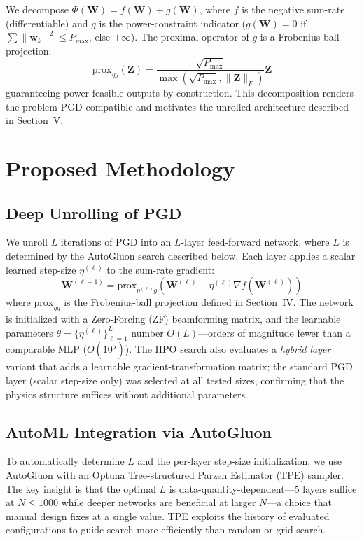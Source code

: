 \documentclass[conference,11pt]{IEEEtran}
\begin{document}
We decompose $\Phi(\mathbf{W}) = f(\mathbf{W}) + g(\mathbf{W})$, where $f$ is the negative sum-rate (differentiable) and $g$ is the power-constraint indicator ($g(\mathbf{W})=0$ if $\sum\|\mathbf{w}_k\|^2\leq P_{\max}$, else $+\infty$). The proximal operator of $g$ is a Frobenius-ball projection:
\begin{equation}
\text{prox}_{\eta g}(\mathbf{Z}) = \frac{\sqrt{P_{\max}}}{\max(\sqrt{P_{\max}}, \|\mathbf{Z}\|_F)} \mathbf{Z}
\end{equation}
guaranteeing power-feasible outputs by construction. This decomposition renders the problem PGD-compatible and motivates the unrolled architecture described in Section~V.

\section{Proposed Methodology}
\subsection{Deep Unrolling of PGD}
We unroll $L$ iterations of PGD into an $L$-layer feed-forward network, where $L$ is determined by the AutoGluon search described below. Each layer applies a scalar learned step-size $\eta^{(\ell)}$ to the sum-rate gradient:
\begin{equation}
\mathbf{W}^{(\ell+1)} = \text{prox}_{\eta^{(\ell)} g}\!\left(\mathbf{W}^{(\ell)} - \eta^{(\ell)} \nabla f(\mathbf{W}^{(\ell)})\right)
\end{equation}
where $\text{prox}_{\eta g}$ is the Frobenius-ball projection defined in Section~IV. The network is initialized with a Zero-Forcing (ZF) beamforming matrix, and the learnable parameters $\theta = \{\eta^{(\ell)}\}_{\ell=1}^{L}$ number $O(L)$---orders of magnitude fewer than a comparable MLP ($O(10^5)$). The HPO search also evaluates a \emph{hybrid layer} variant that adds a learnable gradient-transformation matrix; the standard PGD layer (scalar step-size only) was selected at all tested sizes, confirming that the physics structure suffices without additional parameters.

\subsection{AutoML Integration via AutoGluon}
To automatically determine $L$ and the per-layer step-size initialization, we use AutoGluon with an Optuna Tree-structured Parzen Estimator (TPE) sampler. The key insight is that the optimal $L$ is data-quantity-dependent---5 layers suffice at $N{\leq}1000$ while deeper networks are beneficial at larger $N$---a choice that manual design fixes at a single value. TPE exploits the history of evaluated configurations to guide search more efficiently than random or grid search.
\end{document}
